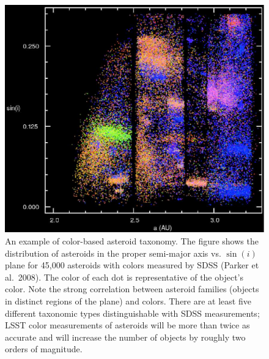 \documentclass{emulateapj}
\begin{document}
\begin{figure}
\includegraphics[width=1.0\hsize,clip]{asteroids.pdf}
\caption{An example of color-based asteroid taxonomy. The figure
shows the distribution of asteroids in the proper semi-major axis vs. $\sin(i)$
plane for 45,000 asteroids with colors measured by SDSS (Parker et al.~2008). 
The color of each dot is representative of the object's color.
Note the strong correlation between asteroid families (objects in distinct regions
of the plane) and colors. There are
at least five different taxonomic types distinguishable with SDSS measurements;
LSST color measurements of asteroids will be more than twice as accurate
and will increase the number of objects by roughly two orders of magnitude.} 
\label{Fig:asteroids}
\end{figure}
\end{document}
